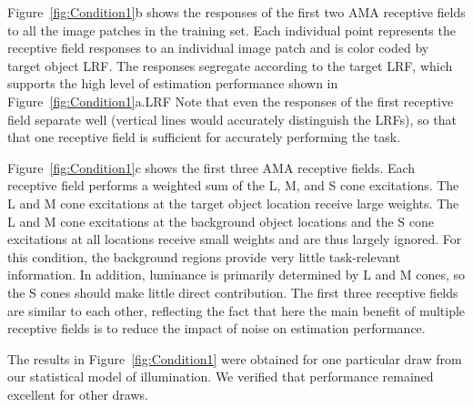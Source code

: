 \documentclass{jov}
\begin{document}
Figure~\ref{fig:Condition1}b shows the responses of the first two AMA receptive fields to all the image patches in the training set.
Each individual point represents the receptive field responses to an individual image patch and
is color coded by target object LRF.
The responses segregate according to the target LRF, which supports the high level 
of estimation performance shown in Figure~\ref{fig:Condition1}a.LRF
Note that even the responses of the first receptive field separate well (vertical lines would accurately
distinguish the LRFs), so that that one receptive field is sufficient for accurately performing the task.

Figure~\ref{fig:Condition1}c shows the first three AMA receptive fields.
Each receptive field performs a weighted sum of the L, M, and S cone excitations.
The L and M cone excitations at the target object location receive large weights.
The L and M cone excitations at the background object locations and the S cone excitations at all locations receive small weights and are thus largely ignored. 
For this condition, the background regions provide very little task-relevant information. 
In addition, luminance is primarily determined by L and M cones, so the S cones should make little
direct contribution.
The first three receptive fields are similar to each other, reflecting the fact that here the main benefit
of multiple receptive fields is to reduce the impact of noise on estimation performance.

The results in Figure~\ref{fig:Condition1} were obtained for one particular draw from our statistical model of illumination.
We verified that performance remained excellent for other draws.
\end{document}
